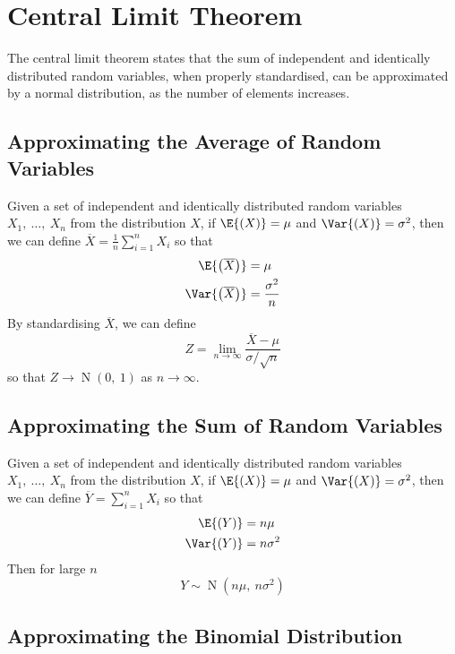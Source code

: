\documentclass{article}
\begin{document}
\section{Central Limit Theorem}
The central limit theorem states that the sum of independent and identically distributed random variables, when properly standardised,
can be approximated by a normal distribution, as the number of elements increases.
\subsection{Approximating the Average of Random Variables}
Given a set of independent and identically distributed random variables \(X_1,\: \ldots,\: X_n\) from the distribution \(X\),
if \(\E{\left( X \right)} = \mu\) and \(\Var{\left( X \right)} = \sigma^2\), then we can define \(\overline{X} = \frac{1}{n} \sum_{i = 1}^n X_i\)
so that
\begin{align*}
    \E{\left( \overline{X} \right)} & = \mu \\
    \Var{\left( \overline{X} \right)} & = \frac{\sigma^2}{n}
\end{align*}
By standardising \(\overline{X}\), we can define
\begin{equation*}
    Z = \lim_{n \to \infty} \frac{\overline{X} - \mu}{\sigma / \sqrt{n}}
\end{equation*}
so that \(Z \to \operatorname{N}{\left( 0,\: 1 \right)}\) as \(n \to \infty\).
\subsection{Approximating the Sum of Random Variables}
Given a set of independent and identically distributed random variables \(X_1,\: \ldots,\: X_n\) from the distribution \(X\),
if \(\E{\left( X \right)} = \mu\) and \(\Var{\left( X \right)} = \sigma^2\), then we can define \(\overline{Y} = \sum_{i = 1}^n X_i\)
so that
\begin{align*}
    \E{\left( Y \right)} & = n \mu \\
    \Var{\left( Y \right)} & = n \sigma^2
\end{align*}
Then for large \(n\)
\begin{equation*}
    Y \sim \operatorname{N}{\left( n \mu,\: n \sigma^2 \right)}
\end{equation*}
\subsection{Approximating the Binomial Distribution}
\end{document}
